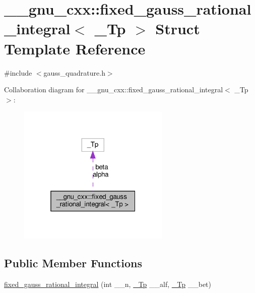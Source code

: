 \hypertarget{struct____gnu__cxx_1_1fixed__gauss__rational__integral}{}\section{\+\_\+\+\_\+gnu\+\_\+cxx\+:\+:fixed\+\_\+gauss\+\_\+rational\+\_\+integral$<$ \+\_\+\+Tp $>$ Struct Template Reference}
\label{struct____gnu__cxx_1_1fixed__gauss__rational__integral}


{\ttfamily \#include $<$gauss\+\_\+quadrature.\+h$>$}



Collaboration diagram for \+\_\+\+\_\+gnu\+\_\+cxx\+:\+:fixed\+\_\+gauss\+\_\+rational\+\_\+integral$<$ \+\_\+\+Tp $>$\+:
\nopagebreak
\begin{figure}[H]
\begin{center}
\leavevmode
\includegraphics[width=205pt]{struct____gnu__cxx_1_1fixed__gauss__rational__integral__coll__graph}
\end{center}
\end{figure}
\subsection*{Public Member Functions}
\begin{DoxyCompactItemize}
\item 
\hyperlink{struct____gnu__cxx_1_1fixed__gauss__rational__integral_a794a8d9a4f972549c1416f2275ea3180}{fixed\+\_\+gauss\+\_\+rational\+\_\+integral} (int \+\_\+\+\_\+n, \hyperlink{namespace____gnu__cxx_a3b19a9c800ca194374ef9172290f7d79}{\+\_\+\+Tp} \+\_\+\+\_\+alf, \hyperlink{namespace____gnu__cxx_a3b19a9c800ca194374ef9172290f7d79}{\+\_\+\+Tp} \+\_\+\+\_\+bet)
\end{DoxyCompactItemize}
